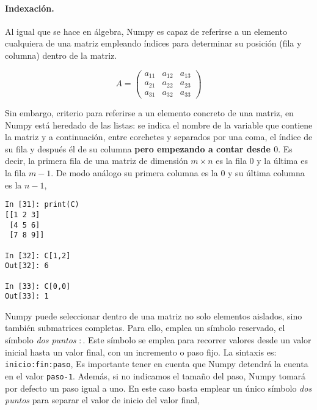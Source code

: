 \begin{paracol}{2}
\paragraph*{Indexación.} Al igual que se hace en álgebra, Numpy es capaz de referirse a un elemento cualquiera de una matriz empleando índices para determinar su posición (fila y columna) dentro de la matriz.
\end{paracol}
\begin{equation*}
A=
\begin{pmatrix}
a_{11}&a_{12}&a_{13}\\
a_{21}&a_{22}&a_{23}\\
a_{31}&a_{32}&a_{33}
\end{pmatrix}
\end{equation*}

\begin{paracol}{2}
Sin embargo,  criterio para referirse a un elemento concreto de una matriz, en Numpy está heredado de las listas: se indica el nombre de la variable que contiene la matriz y a continuación, entre corchetes y separados por una coma, el índice de su fila y después él de su columna \textbf{pero empezando a contar desde $0$}. Es decir, la primera fila de una matriz de dimensión $m\times n$ es la fila $0$ y la última es la fila $m-1$. De modo análogo su primera columna es la $0$ y su última columna es la $n-1$,    
\end{paracol}
\begin{center}
    \begin{minipage}{0.3\textwidth}
        \begin{verbatim}
In [31]: print(C)
[[1 2 3]
 [4 5 6]
 [7 8 9]]

In [32]: C[1,2]
Out[32]: 6

In [33]: C[0,0]
Out[33]: 1
        \end{verbatim}
    \end{minipage}
\end{center}

\begin{paracol}{2}
Numpy puede seleccionar dentro de una matriz no solo elementos aislados, sino también submatrices completas. 
Para ello, emplea un símbolo reservado, el símbolo \emph{dos puntos} $:$. Este símbolo se emplea para recorrer valores desde un valor inicial hasta un valor final, con un incremento o paso fijo. La sintaxis es: \texttt{inicio:fin:paso}, Es importante tener en cuenta que Numpy detendrá la cuenta en el valor \texttt{paso-1}. Además, si no indicamos el tamaño del paso, Numpy tomará por defecto un paso igual a uno. En este caso basta emplear un único símbolo \emph{dos puntos} para separar el valor de inicio del valor final,
\end{paracol}

